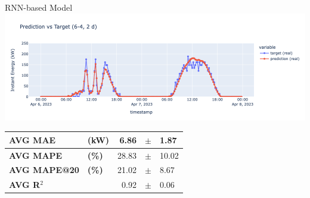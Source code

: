 \begin{frame}{RNN-based Model}
	\centering
	\includegraphics[width=\textwidth]{sections/5_eval/imgs/rnn/grrun2dbuco2.png}

	\begin{table}[]
		\centering
		\begin{tabular}{ll|rcl}
			\textbf{AVG MAE}     & \textbf{(kW)} & 6.86  & $\pm$ & 1.87  \\
			\hline
			\textbf{AVG MAPE}    & \textbf{(\%)} & 28.83 & $\pm$ & 10.02 \\
			\hline
			\textbf{AVG MAPE@20} & \textbf{(\%)} & 21.02 & $\pm$ & 8.67  \\
			\hline
			\textbf{AVG R$^2$}   &               & 0.92  & $\pm$ & 0.06
		\end{tabular}
	\end{table}
\end{frame}

